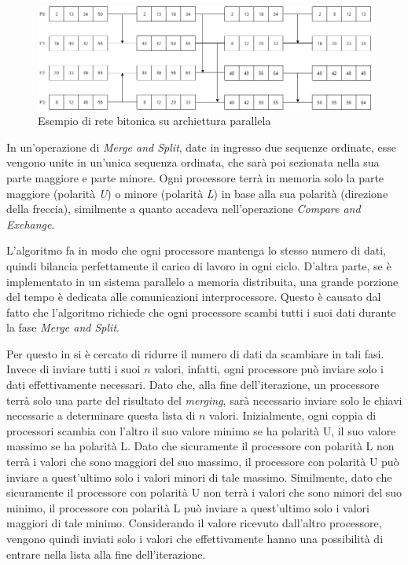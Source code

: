 \begin{figure}[h!]
  \centering
  \includegraphics[width=\linewidth]{Images/bitonic2.png}
  \caption{Esempio di rete bitonica su archiettura parallela}
  \label{bitonic2}
\end{figure}

In un'operazione di \textit{Merge and Split}, date in ingresso due sequenze ordinate, esse vengono unite in un'unica sequenza ordinata, che sarà poi sezionata nella sua parte maggiore e parte minore. Ogni processore terrà in memoria solo la parte maggiore (polarità \textit{U}) o minore (polarità \textit{L}) in base alla sua polarità (direzione della freccia), similmente a quanto accadeva nell'operazione \textit{Compare and Exchange}.

L'algoritmo fa in modo che ogni processore mantenga lo stesso numero di dati, quindi bilancia perfettamente il carico di lavoro in ogni ciclo. D'altra parte, se è implementato in un sistema parallelo a memoria distribuita, una grande porzione del tempo è dedicata alle comunicazioni interprocessore. Questo è causato dal fatto che l'algoritmo richiede che ogni processore scambi tutti i suoi dati durante la fase \textit{Merge and Split}.

Per questo in \cite{PaperBitonic} si è cercato di ridurre il numero di dati da scambiare in tali fasi. Invece di inviare tutti i suoi $n$ valori, infatti, ogni processore può inviare solo i dati effettivamente necessari. Dato che, alla fine dell'iterazione, un processore terrà solo una parte del risultato del \textit{merging}, sarà necessario inviare solo le chiavi necessarie a determinare questa lista di $n$ valori. Inizialmente, ogni coppia di processori scambia con l'altro il suo valore minimo se ha polarità U, il suo valore massimo se ha polarità L. Dato che sicuramente il processore con polarità L non terrà i valori che sono maggiori del suo massimo, il processore con polarità U può inviare a quest'ultimo solo i valori minori di tale massimo. Similmente, dato che sicuramente il processore con polarità U non terrà i valori che sono minori del suo minimo, il processore con polarità L può inviare a quest'ultimo solo i valori maggiori di tale minimo. Considerando il valore ricevuto dall'altro processore, vengono quindi inviati solo i valori che effettivamente hanno una possibilità di entrare nella lista alla fine dell'iterazione.

